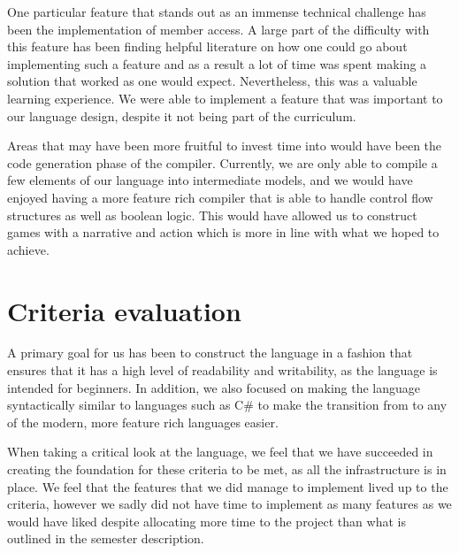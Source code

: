 One particular feature that stands out as an immense technical challenge has been the implementation of member access. A large part of the difficulty with this feature has been finding helpful literature on how one could go about implementing such a feature and as a result a lot of time was spent making a solution that worked as one would expect. Nevertheless, this was a valuable learning experience. We were able to implement a feature that was important to our language design, despite it not being part of the curriculum.

Areas that may have been more fruitful to invest time into would have been the code generation phase of the compiler. Currently, we are only able to compile a few elements of our language into intermediate models, and we would have enjoyed having a more feature rich compiler that is able to handle control flow structures as well as boolean logic. This would have allowed us to construct games with a narrative and action which is more in line with what we hoped to achieve.

\section{Criteria evaluation}
A primary goal for us has been to construct the language in a fashion that ensures that it has a high level of readability and writability, as the language is intended for beginners. In addition, we also focused on making the language syntactically similar to languages such as C\# to make the transition from \dazel{} to any of the modern, more feature rich languages easier. 

When taking a critical look at the language, we feel that we have succeeded in creating the foundation for these criteria to be met, as all the infrastructure is in place. 
We feel that the features that we did manage to implement lived up to the criteria, however we sadly did not have time to implement as many features as we would have liked despite allocating more time to the project than what is outlined in the semester description.

